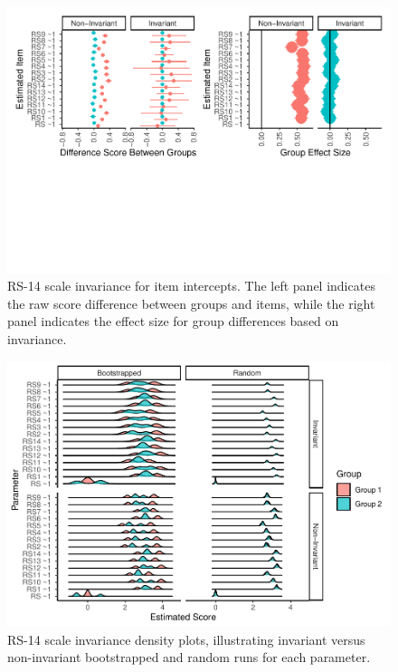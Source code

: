 \documentclass[
  man]{apa7}
\begin{document}
\begin{figure}
\centering
\includegraphics{manuscript_files/figure-latex/rs-partial-pic-1.pdf}
\caption{\label{fig:rs-partial-pic}RS-14 scale invariance for item intercepts. The left panel indicates the raw score difference between groups and items, while the right panel indicates the effect size for group differences based on invariance.}
\end{figure}

\begin{figure}
\centering
\includegraphics{manuscript_files/figure-latex/rs-partial-pic2-1.pdf}
\caption{\label{fig:rs-partial-pic2}RS-14 scale invariance density plots, illustrating invariant versus non-invariant bootstrapped and random runs for each parameter.}
\end{figure}
\end{document}
